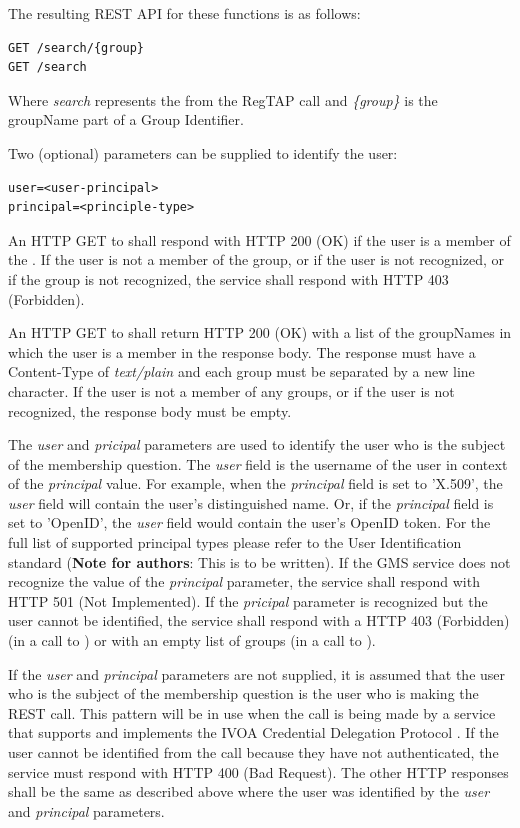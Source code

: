 \documentclass[11pt,a4paper]{ivoa}
\begin{document}
The resulting REST API for these functions is as follows:

\begin{verbatim}
GET /search/{group}
GET /search
\end{verbatim}

Where \emph{search} represents the  from the RegTAP call and \emph{\{group\}} is the groupName part of a Group Identifier.

Two (optional) parameters can be supplied to identify the user:

\begin{verbatim}
user=<user-principal>
principal=<principle-type>
\end{verbatim}

An HTTP GET to  shall respond with HTTP 200 (OK) if the user is a member of the .  If the user is not a member of the group, or if the user is not recognized, or if the group is not recognized, the service shall respond with HTTP 403 (Forbidden).

An HTTP GET to  shall return HTTP 200 (OK) with a list of the groupNames in which the user is a member in the response body.  The response must have a Content-Type of \emph {text/plain} and each group must be separated by a new line character.  If the user is not a member of any groups, or if the user is not recognized, the response body must be empty.

The \emph{user} and \emph{pricipal} parameters are used to identify the user who is the subject of the membership question.  The \emph{user} field is the username of the user in context of the \emph{principal} value.  For example, when the \emph{principal} field is set to 'X.509', the \emph{user} field will contain the user's distinguished name.  Or, if the \emph{principal} field is set to 'OpenID', the \emph{user} field would contain the user's OpenID token.  For the full list of supported principal types please refer to the User Identification standard (\textbf{Note for authors}: This is to be written).  If the GMS service does not recognize the value of the \emph{principal} parameter, the service shall respond with HTTP 501 (Not Implemented).  If the \emph{pricipal} parameter is recognized but the user cannot be identified, the service shall respond with a HTTP 403 (Forbidden) (in a call to  ) or with an empty list of groups (in a call to  ).

If the \emph{user} and \emph{principal} parameters are not supplied, it is assumed that the user who is the subject of the membership question is the user who is making the REST call.  This pattern will be in use when the call is being made by a service that supports and implements the IVOA Credential Delegation Protocol \citep{std:CDP}.  If the user cannot be identified from the call because they have not authenticated, the service must respond with HTTP 400 (Bad Request).  The other HTTP responses shall be the same as described above where the user was identified by the \emph{user} and \emph{principal} parameters.
\end{document}
